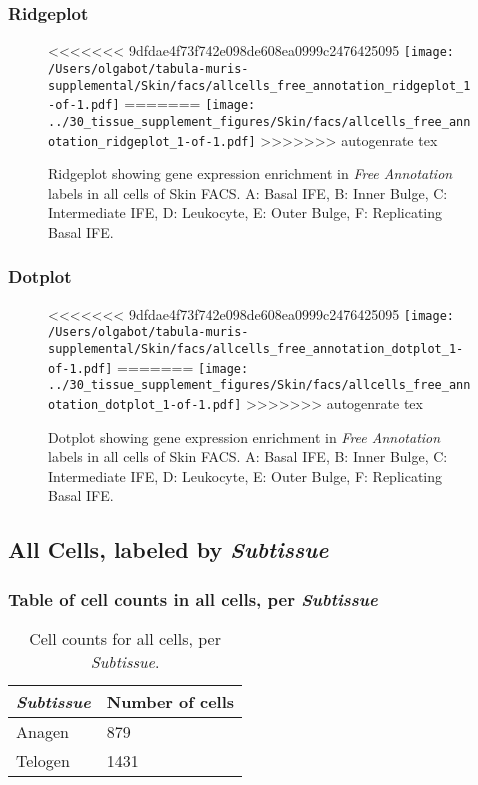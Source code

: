 \clearpage

\subsubsection{Ridgeplot}
\begin{figure}[h]
\centering
<<<<<<< 9dfdae4f73f742e098de608ea0999c2476425095
\texttt{[image: /Users/olgabot/tabula-muris-supplemental/Skin/facs/allcells\_free\_annotation\_ridgeplot\_1-of-1.pdf]}
=======
\texttt{[image: ../30\_tissue\_supplement\_figures/Skin/facs/allcells\_free\_annotation\_ridgeplot\_1-of-1.pdf]}
>>>>>>> autogenrate tex

\caption{ Ridgeplot  showing gene expression enrichment in \emph{Free Annotation} labels in all cells of Skin FACS. A: Basal IFE, B: Inner Bulge, C: Intermediate IFE, D: Leukocyte, E: Outer Bulge, F: Replicating Basal IFE.}
\end{figure}


\clearpage

\subsubsection{Dotplot}
\begin{figure}[h]
\centering
<<<<<<< 9dfdae4f73f742e098de608ea0999c2476425095
\texttt{[image: /Users/olgabot/tabula-muris-supplemental/Skin/facs/allcells\_free\_annotation\_dotplot\_1-of-1.pdf]}
=======
\texttt{[image: ../30\_tissue\_supplement\_figures/Skin/facs/allcells\_free\_annotation\_dotplot\_1-of-1.pdf]}
>>>>>>> autogenrate tex

\caption{ Dotplot  showing gene expression enrichment in \emph{Free Annotation} labels in all cells of Skin FACS. A: Basal IFE, B: Inner Bulge, C: Intermediate IFE, D: Leukocyte, E: Outer Bulge, F: Replicating Basal IFE.}
\end{figure}


\clearpage

\subsection{All Cells, labeled by \emph{Subtissue}}
\subsubsection{Table of cell counts in all cells, per \emph{Subtissue}}\begin{table}[h]
\centering
\label{my-label}
\begin{tabular}{@{}ll@{}}
\toprule

\emph{Subtissue}& Number of cells \\ \midrule
Anagen & 879 \\

Telogen & 1431 \\
\bottomrule
\end{tabular}
\caption{Cell counts for all cells, per \emph{Subtissue}.}
\end{table}

